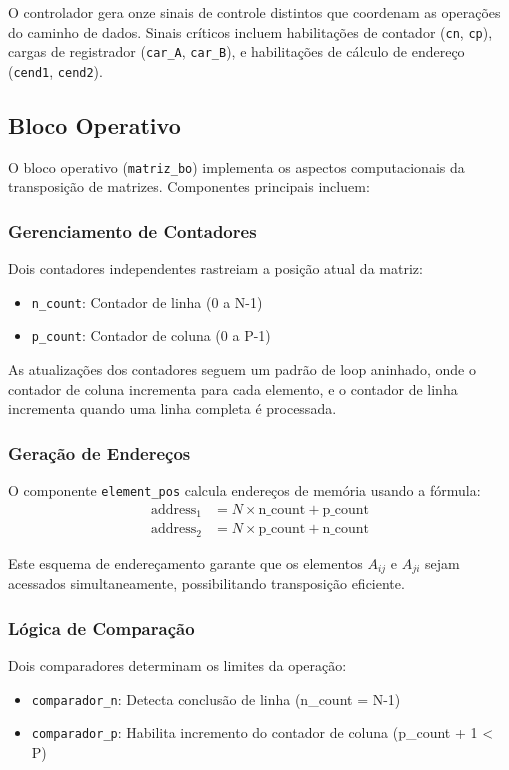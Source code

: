 \documentclass[conference]{IEEEtran}
\begin{document}
O controlador gera onze sinais de controle distintos que coordenam as operações do caminho de dados. Sinais críticos incluem habilitações de contador (\texttt{cn}, \texttt{cp}), cargas de registrador (\texttt{car\_A}, \texttt{car\_B}), e habilitações de cálculo de endereço (\texttt{cend1}, \texttt{cend2}).

\subsection{Bloco Operativo}

O bloco operativo (\texttt{matriz\_bo}) implementa os aspectos computacionais da transposição de matrizes. Componentes principais incluem:

\subsubsection{Gerenciamento de Contadores}
Dois contadores independentes rastreiam a posição atual da matriz:
\begin{itemize}
\item \texttt{n\_count}: Contador de linha (0 a N-1)
\item \texttt{p\_count}: Contador de coluna (0 a P-1)
\end{itemize}

As atualizações dos contadores seguem um padrão de loop aninhado, onde o contador de coluna incrementa para cada elemento, e o contador de linha incrementa quando uma linha completa é processada.

\subsubsection{Geração de Endereços}
O componente \texttt{element\_pos} calcula endereços de memória usando a fórmula:
\begin{align}
\text{address}_1 &= N \times \text{n\_count} + \text{p\_count} \\
\text{address}_2 &= N \times \text{p\_count} + \text{n\_count}
\end{align}

Este esquema de endereçamento garante que os elementos $A_{ij}$ e $A_{ji}$ sejam acessados simultaneamente, possibilitando transposição eficiente.

\subsubsection{Lógica de Comparação}
Dois comparadores determinam os limites da operação:
\begin{itemize}
\item \texttt{comparador\_n}: Detecta conclusão de linha (n\_count = N-1)
\item \texttt{comparador\_p}: Habilita incremento do contador de coluna (p\_count + 1 < P)
\end{itemize}
\end{document}
